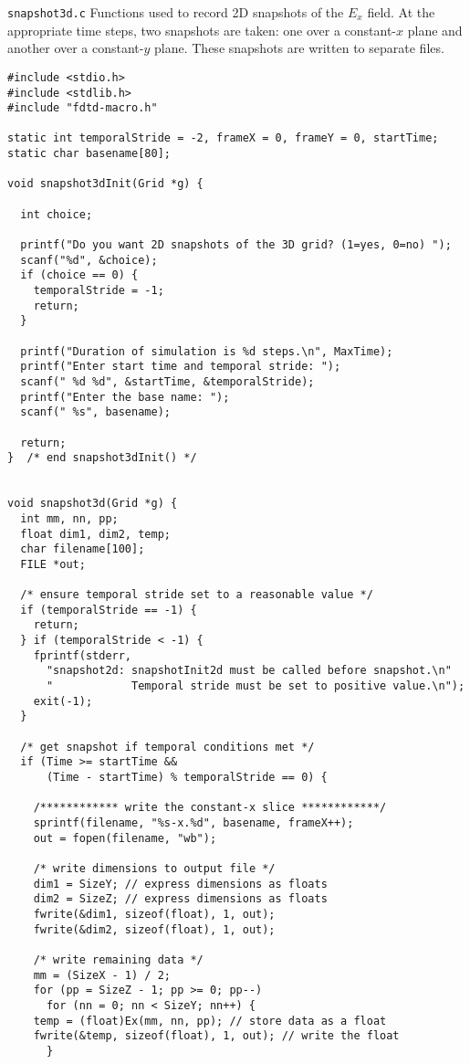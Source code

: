 \begin{program}
{\tt snapshot3d.c}  Functions used to record 2D snapshots of the $E_x$
field.  At the appropriate time steps, two snapshots are taken: one
over a constant-$x$ plane and another over a constant-$y$ plane.
These snapshots are written to separate files.  
\label{pro:snapshot3d}
\codemiddle
\begin{lstlisting}
#include <stdio.h>
#include <stdlib.h>
#include "fdtd-macro.h"

static int temporalStride = -2, frameX = 0, frameY = 0, startTime;
static char basename[80];

void snapshot3dInit(Grid *g) {
  
  int choice;
  
  printf("Do you want 2D snapshots of the 3D grid? (1=yes, 0=no) ");
  scanf("%d", &choice);
  if (choice == 0) {
    temporalStride = -1;
    return;
  }

  printf("Duration of simulation is %d steps.\n", MaxTime);
  printf("Enter start time and temporal stride: ");
  scanf(" %d %d", &startTime, &temporalStride);
  printf("Enter the base name: ");
  scanf(" %s", basename);

  return;
}  /* end snapshot3dInit() */


void snapshot3d(Grid *g) {
  int mm, nn, pp;
  float dim1, dim2, temp;
  char filename[100];
  FILE *out;

  /* ensure temporal stride set to a reasonable value */
  if (temporalStride == -1) {
    return;
  } if (temporalStride < -1) {
    fprintf(stderr,
      "snapshot2d: snapshotInit2d must be called before snapshot.\n"
      "            Temporal stride must be set to positive value.\n");
    exit(-1);
  }

  /* get snapshot if temporal conditions met */
  if (Time >= startTime && 
      (Time - startTime) % temporalStride == 0) {

    /************ write the constant-x slice ************/
    sprintf(filename, "%s-x.%d", basename, frameX++);
    out = fopen(filename, "wb");

    /* write dimensions to output file */
    dim1 = SizeY; // express dimensions as floats
    dim2 = SizeZ; // express dimensions as floats
    fwrite(&dim1, sizeof(float), 1, out);
    fwrite(&dim2, sizeof(float), 1, out);

    /* write remaining data */
    mm = (SizeX - 1) / 2;
    for (pp = SizeZ - 1; pp >= 0; pp--)
      for (nn = 0; nn < SizeY; nn++) {
	temp = (float)Ex(mm, nn, pp); // store data as a float
	fwrite(&temp, sizeof(float), 1, out); // write the float
      }


\end{lstlisting}
\end{program}
